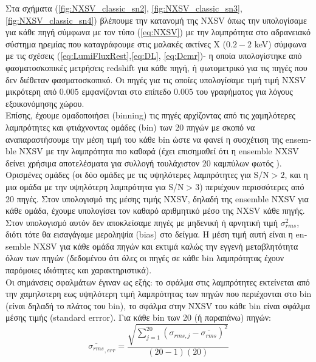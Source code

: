 Στα σχήματα (\ref{fig:NXSV_classic_sn2}, \ref{fig:NXSV_classic_sn3}, \ref{fig:NXSV_classic_sn4}) βλέπουμε την κατανομή της \textlatin{NXSV} όπως την υπολογίσαμε για κάθε πηγή σύμφωνα με τον τύπο (\ref{eq:NXSV}) με την λαμπρότητα στο αδρανειακό σύστημα ηρεμίας που καταγράφουμε  στις μαλακές ακτίνες Χ ($0.2-2$ \textlatin{keV}) σύμφωνα με τις σχέσεις (\ref{eq:LumiFluxRest},\ref{eq:DL}, \ref{eq:Dcmr})- η οποία υπολογίστηκε από φασματοσκοπικές μετρήσεις \textlatin{redshift} για κάθε πηγή, ή φωτομετρικό για τις πηγές που δεν διέθεταν φασματοσκοπικό. Οι πηγές για τις οποίες υπολογίσαμε τιμή τιμή \textlatin{NXSV} μικρότερη από $0.005$ εμφανίζονται στο επίπεδο $0.005$ του γραφήματος για λόγους εξοικονόμησης χώρου. \\
Επίσης, έχουμε ομαδοποιήσει (\textlatin{binning}) τις πηγές αρχίζοντας από τις χαμηλότερες λαμπρότητες και φτιάχνοντας ομάδες (\textlatin{bin}) των 20 πηγών με σκοπό να αναπαραστήσουμε την μέση τιμή του κάθε \textlatin{bin} ώστε να φανεί η συσχέτιση της \textlatin{ensemble NXSV} με την λαμπρότητα πιο καθαρά (έχει επισημαθεί ότι η \textlatin{ensemble NXSV} δείνει χρήσιμα αποτελέσματα για συλλογή τουλάχιστον 20 καμπύλων φωτός \cite{2013ApJ...771....9A}). Ορισμένες ομάδες (οι δύο ομάδες με τις υψηλότερες λαμπρότητες για \textlatin{S/N}$>2$, και η μια ομάδα με την υψηλότερη λαμπρότητα για \textlatin{S/N}$>3$) περιέχουν περισσότερες από 20 πηγές. Στον υπολογισμό της μέσης τιμής \textlatin{NXSV}, δηλαδή της \textlatin{ensemble NXSV} για κάθε ομάδα, έχουμε υπολογίσει τον καθαρό αριθμητικό μέσο της \textlatin{NXSV} κάθε πηγής. Στον υπολογισμό αυτόν δεν αποκλείσαμε πηγές με μηδενική ή αρνητική τιμή $\sigma_{rms}^2$, διότι τότε θα εισαγάγαμε  μεροληψία \textlatin{(bias)} στο δείγμα\cite{2017MNRAS.471.4398P}\cite{2013ApJ...771....9A}. Η μέση τιμή αυτή είναι η \textlatin{ensemble NXSV} για κάθε ομάδα πηγών και εκτιμά καλώς\cite{2017MNRAS.471.4398P}\cite{2013ApJ...771....9A} την εγγενή μεταβλητότητα όλων των πηγών (δεδομένου ότι όλες οι πηγές σε κάθε \textlatin{bin} λαμπρότητας έχουν παρόμοιες ιδιότητες και χαρακτηριστικά). \\
Οι σημάνσεις σφαλμάτων έγιναν ως εξής: το σφάλμα στις λαμπρότητες εκτείνεται από την χαμηλοτερη εως υψηλότερη τιμή λαμπρότητας των πηγών που περιέχονται στο \textlatin{bin} (είναι δηλαδή το πλάτος του \textlatin{bin}), το σφάλμα στην \textlatin{NXSV} του κάθε \textlatin{bin} είναι σφάλμα μέσης τιμής \textlatin{(standard errror)}. Για κάθε \textlatin{bin} των 20 (ή παραπάνω) πηγών:
$$ \overline{\sigma_{rms}}_{,err}  =\dfrac{ \sqrt{ \sum_{j=1}^{20}(\sigma_{rms, j}- \overline{\sigma_{rms}})^2}}{(20-1)(20)}$$

